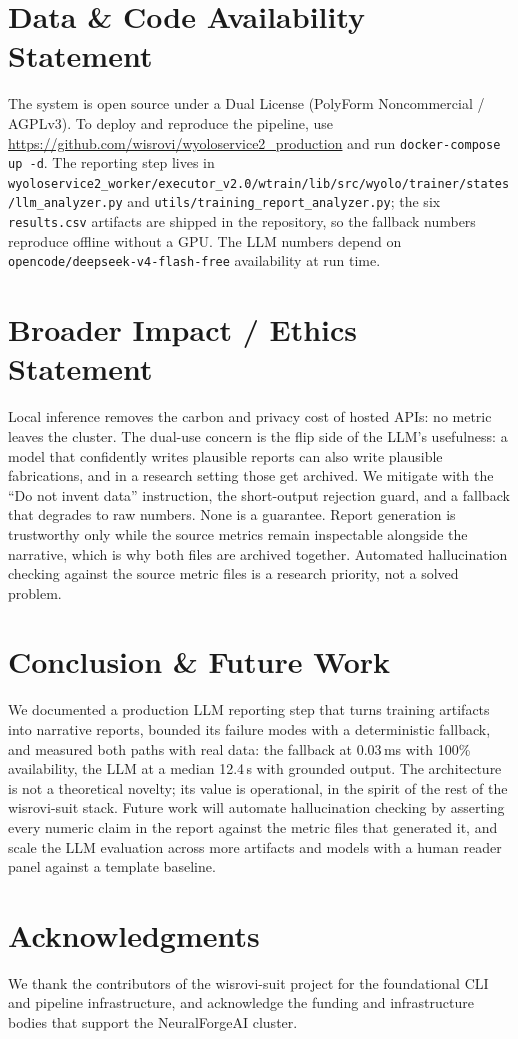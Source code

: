 \documentclass[10pt,twocolumn,letterpaper]{article}
\begin{document}
\section{Data \& Code Availability Statement}
The system is open source under a Dual License (PolyForm Noncommercial / AGPLv3). To deploy and reproduce the pipeline, use \url{https://github.com/wisrovi/wyoloservice2_production} and run \texttt{docker-compose up -d}. The reporting step lives in \texttt{wyoloservice2\_worker/executor\_v2.0/wtrain/lib/src/wyolo/trainer/states/llm\_analyzer.py} and \texttt{utils/training\_report\_analyzer.py}; the six \texttt{results.csv} artifacts are shipped in the repository, so the fallback numbers reproduce offline without a GPU. The LLM numbers depend on \texttt{opencode/deepseek-v4-flash-free} availability at run time.

\section{Broader Impact / Ethics Statement}
Local inference removes the carbon and privacy cost of hosted APIs: no metric leaves the cluster. The dual-use concern is the flip side of the LLM's usefulness: a model that confidently writes plausible reports can also write plausible fabrications, and in a research setting those get archived. We mitigate with the ``Do not invent data'' instruction, the short-output rejection guard, and a fallback that degrades to raw numbers. None is a guarantee. Report generation is trustworthy only while the source metrics remain inspectable alongside the narrative, which is why both files are archived together. Automated hallucination checking against the source metric files is a research priority, not a solved problem.

\section{Conclusion \& Future Work}
We documented a production LLM reporting step that turns training artifacts into narrative reports, bounded its failure modes with a deterministic fallback, and measured both paths with real data: the fallback at 0.03\,ms with 100\% availability, the LLM at a median 12.4\,s with grounded output. The architecture is not a theoretical novelty; its value is operational, in the spirit of the rest of the wisrovi-suit stack. Future work will automate hallucination checking by asserting every numeric claim in the report against the metric files that generated it, and scale the LLM evaluation across more artifacts and models with a human reader panel against a template baseline.

\section{Acknowledgments}
We thank the contributors of the wisrovi-suit project for the foundational CLI and pipeline infrastructure, and acknowledge the funding and infrastructure bodies that support the NeuralForgeAI cluster.



\end{document}
